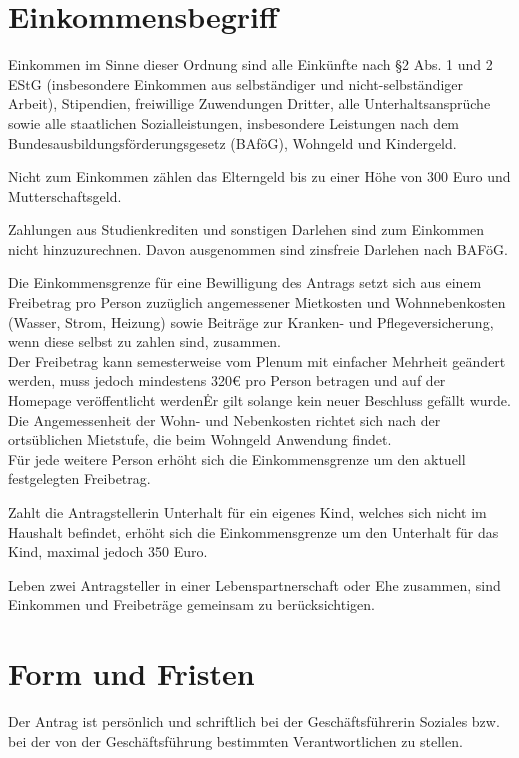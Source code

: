 \begin{multicols}{2}
\section{Einkommensbegriff}
\Abs \Satz Einkommen im Sinne dieser Ordnung sind alle Einkünfte nach §2 Abs. 1 und 2 EStG (insbesondere Einkommen aus selbständiger und nicht-selbständiger Arbeit), Stipendien, freiwillige Zuwendungen Dritter, alle Unterhaltsansprüche sowie alle staatlichen Sozialleistungen, insbesondere Leistungen nach dem Bundesausbildungsförderungsgesetz (BAföG), Wohngeld und Kindergeld.

\Abs \Satz Nicht zum Einkommen zählen das Elterngeld bis zu einer Höhe von 300 Euro und Mutterschaftsgeld.

\Abs \Satz Zahlungen aus Studienkrediten und sonstigen Darlehen sind zum Einkommen nicht hinzuzurechnen. Davon ausgenommen sind zinsfreie Darlehen nach BAFöG.

\Abs \Satz Die Einkommensgrenze für eine Bewilligung des Antrags setzt sich aus einem Freibetrag pro Person zuzüglich angemessener Mietkosten und Wohnnebenkosten (Wasser, Strom, Heizung) sowie Beiträge zur Kranken- und Pflegeversicherung, wenn diese selbst zu zahlen sind, zusammen.\\
\Satz Der Freibetrag kann semesterweise vom Plenum mit einfacher Mehrheit geändert werden, muss jedoch mindestens 320€ pro Person betragen und auf der Homepage veröffentlicht werden\. Er gilt solange kein neuer Beschluss gefällt wurde. \\
\Satz Die Angemessenheit der Wohn- und Nebenkosten richtet sich nach der ortsüblichen Mietstufe, die beim Wohngeld Anwendung findet. \\
\Satz Für jede weitere Person erhöht sich die Einkommensgrenze um den aktuell festgelegten Freibetrag.

\Abs \Satz Zahlt die Antragstellerin Unterhalt für ein eigenes Kind, welches sich nicht im Haushalt befindet, erhöht sich die Einkommensgrenze um den Unterhalt für das Kind, maximal jedoch 350 Euro.

\Abs \Satz Leben zwei Antragsteller in einer Lebenspartnerschaft oder Ehe zusammen, sind Einkommen und Freibeträge gemeinsam zu berücksichtigen.

\section{Form und Fristen}
\Abs \Satz Der Antrag ist persönlich und schriftlich bei der Geschäftsführerin Soziales bzw. bei der von der Geschäftsführung bestimmten Verantwortlichen zu stellen.


\end{multicols}
